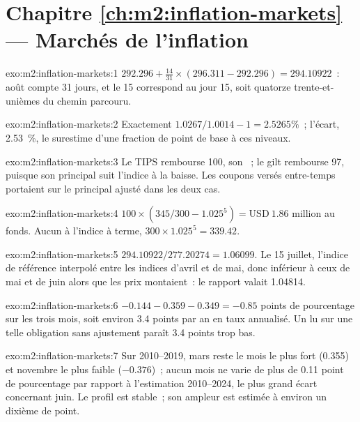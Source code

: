 \section*{Chapitre \ref{ch:m2:inflation-markets} --- Marchés de l'inflation}

\begin{solution}{exo:m2:inflation-markets:1}
$292.296 + \tfrac{14}{31}\times(296.311 - 292.296) = 294.10922$~: août compte 31
jours, et le 15 correspond au jour 15, soit quatorze trente-et-unièmes du chemin parcouru.
\end{solution}

\begin{solution}{exo:m2:inflation-markets:2}
Exactement $1.0267/1.0014 - 1 = 2.5265\%$~; l'écart, 2.53~\%, le surestime
d'une fraction de point de base à ces niveaux.
\end{solution}

\begin{solution}{exo:m2:inflation-markets:3}
Le TIPS rembourse 100, son ~; le gilt rembourse 97, puisque son
principal suit l'indice à la baisse. Les coupons versés entre-temps portaient sur le
principal ajusté dans les deux cas.
\end{solution}

\begin{solution}{exo:m2:inflation-markets:4}
$100 \times (345/300 - 1.025^5) = \text{USD}~1.86$ million au fonds. Aucun à
l'indice à terme, $300 \times 1.025^5 = 339.42$.
\end{solution}

\begin{solution}{exo:m2:inflation-markets:5}
$294.10922/277.20274 = 1.06099$. Le 15 juillet, l'indice de référence interpolé
entre les indices d'avril et de mai, donc inférieur à ceux de mai et de juin alors que les prix
montaient~: le rapport valait 1.04814.
\end{solution}

\begin{solution}{exo:m2:inflation-markets:6}
$-0.144 - 0.359 - 0.349 = -0.85$ points de pourcentage sur les trois mois, soit environ
3.4 points par an en taux annualisé. Un  lu sur une telle obligation sans
ajustement paraît 3.4 points trop bas.
\end{solution}

\begin{solution}{exo:m2:inflation-markets:7}
Sur 2010--2019, mars reste le mois le plus fort (0.355) et novembre le
plus faible ($-0.376$)~; aucun mois ne varie de plus de 0.11 point de pourcentage par rapport à
l'estimation 2010--2024, le plus grand écart concernant juin. Le profil est stable~; son
ampleur est estimée à environ un dixième de point.
\end{solution}

